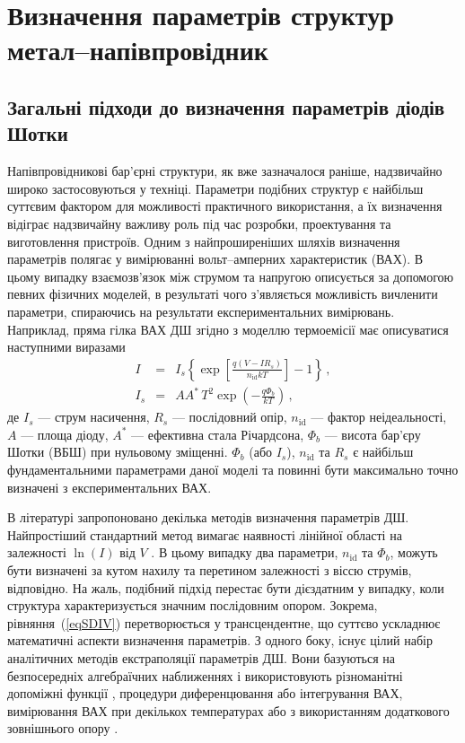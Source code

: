 \chapter{Визначення параметрів структур метал--напівпровідник\label{Ch_MSMethod}}


\section{Загальні підходи до визначення параметрів діодів Шотки}
Напівпровідникові бар'єрні структури, як вже зазначалося раніше, надзвичайно широко застосовуються у техніці.
Параметри подібних структур є найбільш суттєвим фактором для можливості практичного використання,
а їх визначення відіграє надзвичайну важливу роль під час розробки, проектування та виготовлення пристроїв.
Одним з найпроширеніших шляхів визначення параметрів полягає у вимірюванні вольт--амперних характеристик (ВАХ).
В цьому випадку взаємозв'язок між струмом та напругою описується за допомогою певних фізичних моделей, в
результаті чого з'являється можливість вичленити параметри, спираючись на результати експериментальних вимірювань.
Наприклад, пряма гілка ВАХ ДШ згідно з моделлю термоемісії має описуватися \cite{Rhoderick1988} наступними виразами
\begin{eqnarray}
\label{eqSDIV}
I&=&I_s\left\{\exp\left[\frac{q(V-IR_s)}{n_\mathrm{id}kT}\right]-1\right\}\,,\\
\label{eqSDIs}
I_s&=&AA^*\,T^2\exp\left(-\frac{q\Phi_b}{kT}\right)\,,
\end{eqnarray}
де
$I_s$ --- струм насичення,
$R_s$ --- послідовний опір,
$n_\mathrm{id}$ --- фактор неідеальності,
$A$ --- площа діоду,
$A^*$ --- ефективна стала Річардсона,
$\Phi_b$ --- висота бар'єру Шотки (ВБШ) при нульовому зміщенні.
$\Phi_b$ (або $I_s$), $n_\mathrm{id}$ та $R_s$ є найбільш фундаментальними параметрами даної моделі та повинні бути максимально точно визначені з експериментальних ВАХ.

В літературі запропоновано декілька методів визначення параметрів ДШ.
Найпростіший стандартний метод вимагає наявності лінійної області на залежності $\ln(I)$ від  $V$ \cite{Sze1985,Rhoderick1988}.
В цьому випадку два параметри, $n_\mathrm{id}$ та $\Phi_b$, можуть бути визначені за кутом нахилу та перетином  залежності з віссю струмів, відповідно.
На жаль, подібний підхід перестає бути дієздатним у випадку, коли структура характеризується значним послідовним опором.
Зокрема, рівняння~(\ref{eqSDIV}) перетворюється у трансцендентне, що суттєво ускладнює математичні аспекти визначення параметрів.
З одного боку, існує цілий набір аналітичних методів екстраполяції параметрів ДШ.
Вони базуються на безпосередніх алгебраїчних наближеннях і використовують різноманітні допоміжні функції \cite{Norde,Lien,Werner,Cheung,Gromov,Lee,Bohlin,Cibils,Manifacier},
процедури  диференцювання  \cite{Mikhelashvili} або інтегрування  \cite{Kaminski,Ortiz1995,Durmus} ВАХ,
вимірювання ВАХ при декількох температурах \cite{Sato} або з використанням додаткового зовнішнього опору \cite{Lyakas}.

